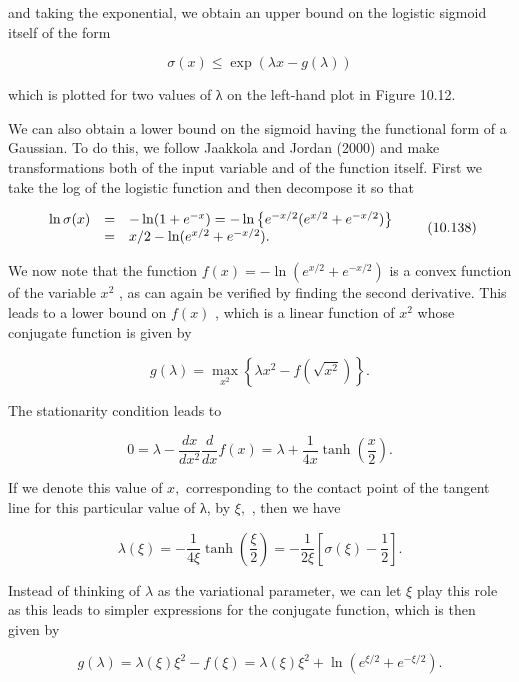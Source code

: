 \documentclass[
  10
]{article}
\begin{document}
and taking the exponential, we obtain an upper bound on the logistic
sigmoid itself of the form

\[
\sigma (x) \leqslant \exp (\lambda x - g (\lambda))\tag{10.137}
\]

which is plotted for two values of λ on the left-hand plot in Figure
10.12.

We can also obtain a lower bound on the sigmoid having the functional
form of a Gaussian. To do this, we follow Jaakkola and Jordan (2000) and
make transformations both of the input variable and of the function
itself. First we take the log of the logistic function and then
decompose it so that

\[
\begin{array}{r c l} \ln \sigma (x) & = & - \ln (1 + e ^ {- x}) = - \ln \left\{e ^ {- x / 2} (e ^ {x / 2} + e ^ {- x / 2}) \right\} \\ & = & x / 2 - \ln (e ^ {x / 2} + e ^ {- x / 2}). \end{array}\tag{10.138}
\]

We now note that the function
\(f ( x ) = - \ln ( e ^ { x / 2 } + e ^ { - x / 2 } )\) is a convex
function of the variable \(x ^ { 2 }\) , as can again be verified by
finding the second derivative. This leads to a lower bound on
\(f ( x )\) , which is a linear function of \(x ^ { 2 }\) whose
conjugate function is given by

\[
g (\lambda) = \max _ {x ^ {2}} \left\{\lambda x ^ {2} - f \left(\sqrt {x ^ {2}}\right) \right\}.\tag{10.139}
\]

The stationarity condition leads to

\[
0 = \lambda - \frac {d x}{d x ^ {2}} \frac {d}{d x} f (x) = \lambda + \frac {1}{4 x} \tanh \left(\frac {x}{2}\right).\tag{10.140}
\]

If we denote this value of \(x ,\) corresponding to the contact point of
the tangent line for this particular value of λ, by \(\xi ,\) , then we
have

\[
\lambda (\xi) = - \frac {1}{4 \xi} \tanh \left(\frac {\xi}{2}\right) = - \frac {1}{2 \xi} \left[ \sigma (\xi) - \frac {1}{2} \right].\tag{10.141}
\]

Instead of thinking of \(\lambda\) as the variational parameter, we can
let \(\xi\) play this role as this leads to simpler expressions for the
conjugate function, which is then given by

\[
g (\lambda) = \lambda (\xi) \xi^ {2} - f (\xi) = \lambda (\xi) \xi^ {2} + \ln (e ^ {\xi / 2} + e ^ {- \xi / 2}).\tag{10.142}
\]
\end{document}
